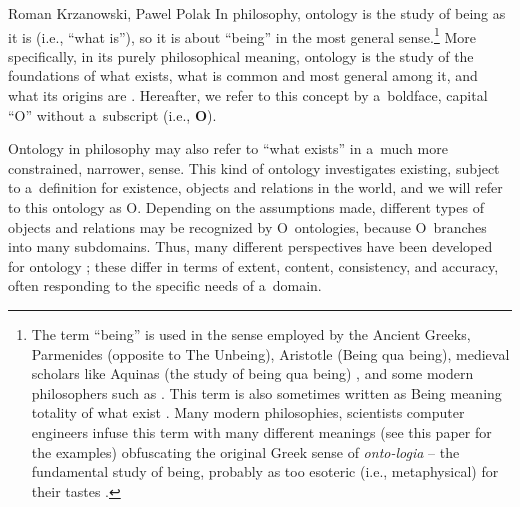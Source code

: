 \begin{artengenv2auth}{Roman Krzanowski, Pawel Polak}
In philosophy, ontology is the study of being as it is (i.e., ``what is''), so it is about ``being'' in the most general sense.\footnote{The term ``being'' is used in the sense employed by the Ancient Greeks, Parmenides (opposite to The Unbeing), Aristotle (Being qua being), medieval scholars like Aquinas (the study of being qua being)
\parencite[][]{kerr_aquinas_2022}, %
 and some modern philosophers such as 
\parencites[][]{jacquette_ontology_2002}[][]{strozewski_ontologia_2004}[or][]{perzanowski_rozprawa_2015}. %
 This term is also sometimes written as Being meaning totality of what exist 
\parencite[][p.160]{kenny_new_2012}. %
 Many modern philosophies, scientists computer engineers infuse this term with many different meanings (see this paper for the examples) obfuscating the original Greek sense of \textit{onto-logia} -- the fundamental study of being, probably as too esoteric (i.e., metaphysical) for their tastes 
\parencites[see also][]{kenny_new_2012}[][]{hofweber_logic_2021}.%
} More specifically, in its purely philosophical meaning, ontology is the study of the foundations of what exists, what is common and most general among it, and what its origins are 
\parencites[see, e.g.,][]{jacquette_ontology_2002}[][p.32]{strozewski_ontologia_2004}. %
 Hereafter, we refer to this concept by a~boldface, capital ``O'' without a~subscript (i.e., \textbf{O}).

Ontology in philosophy may also refer to ``what exists'' in a~much more constrained, narrower, sense. This kind of ontology investigates existing, subject to a~definition for existence, objects and relations in the world, and we will refer to this ontology as O. Depending on the assumptions made, different types of objects and relations may be recognized by O~ontologies, because O~branches into many subdomains. Thus, many different perspectives have been developed for ontology
\parencites[e.g.,][]{quine_word_1960}[][]{jacquette_ontology_2002}[][]{strozewski_ontologia_2004}[][]{baker_metaphysics_2007}[][]{chalmers_metametaphysics_2009}[][]{effingham_introduction_2013}[][]{ingarden_controversy_2013}[][]{ingarden_controversy_2016}[][]{berto_ontology_2015}[][]{perzanowski_rozprawa_2015}[][]{thomasson_ontology_2015}[][]{hofweber_logic_2021}; %
 these differ in terms of extent, content, consistency, and accuracy, often responding to the specific needs of a~domain.


\end{artengenv2auth}
